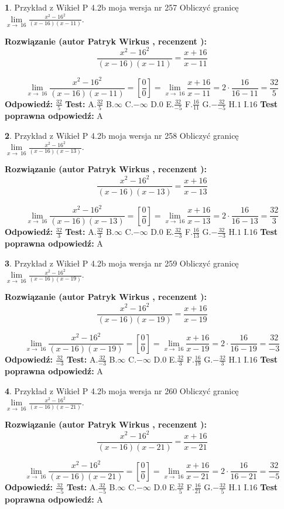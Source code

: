 \documentclass[12pt, a4paper]{article}
\theoremstyle{definition} %
\newtheorem{zad}{}
\newcommand{\zadStart}[1]{\begin{zad}#1\newline}
\newcommand{\zadStop}{\end{zad}}
\newcommand{\rozwStart}[2]{\noindent \textbf{Rozwiązanie (autor #1 , recenzent #2): }\newline}
\newcommand{\rozwStop}{\newline}
\newcommand{\odpStart}{\noindent \textbf{Odpowiedź:}\newline}
\newcommand{\odpStop}{\newline}
\newcommand{\testStart}{\noindent \textbf{Test:}\newline}
\newcommand{\testStop}{\newline}
\newcommand{\kluczStart}{\noindent \textbf{Test poprawna odpowiedź:}\newline}
\newcommand{\kluczStop}{\newline}
\begin{document}
\zadStart{Przykład z Wikieł P 4.2b moja wersja nr 257}
Obliczyć granicę $\lim\limits_{x\to\ 16}\frac{x^{2}-16^{2}}{(x-16)(x-11)}$.
\zadStop
\rozwStart{Patryk Wirkus}{}
$$\frac{x^{2}-16^{2}}{(x-16)(x-11)}=\frac{x+16}{x-11}$$

$$\lim\limits_{x\to\ 16}\frac{x^{2}-16^{2}}{(x-16)(x-11)}=[\frac{0}{0}]=\lim\limits_{x\to\ 16}\frac{x+16}{x-11}=2 \cdot \frac{16}{16-11} = \frac{32}{5}$$
\rozwStop
\odpStart
$\frac{32}{5}$
\odpStop
\testStart
A.$\frac{32}{5}$
B.$\infty$
C.$-\infty$
D.$0$
E.$\frac{32}{-5}$
F.$\frac{16}{11}$
G.$-\frac{32}{-5}$
H.$1$
I.$16$
\testStop
\kluczStart
A
\kluczStop



\zadStart{Przykład z Wikieł P 4.2b moja wersja nr 258}
Obliczyć granicę $\lim\limits_{x\to\ 16}\frac{x^{2}-16^{2}}{(x-16)(x-13)}$.
\zadStop
\rozwStart{Patryk Wirkus}{}
$$\frac{x^{2}-16^{2}}{(x-16)(x-13)}=\frac{x+16}{x-13}$$

$$\lim\limits_{x\to\ 16}\frac{x^{2}-16^{2}}{(x-16)(x-13)}=[\frac{0}{0}]=\lim\limits_{x\to\ 16}\frac{x+16}{x-13}=2 \cdot \frac{16}{16-13} = \frac{32}{3}$$
\rozwStop
\odpStart
$\frac{32}{3}$
\odpStop
\testStart
A.$\frac{32}{3}$
B.$\infty$
C.$-\infty$
D.$0$
E.$\frac{32}{-3}$
F.$\frac{16}{13}$
G.$-\frac{32}{-3}$
H.$1$
I.$16$
\testStop
\kluczStart
A
\kluczStop



\zadStart{Przykład z Wikieł P 4.2b moja wersja nr 259}
Obliczyć granicę $\lim\limits_{x\to\ 16}\frac{x^{2}-16^{2}}{(x-16)(x-19)}$.
\zadStop
\rozwStart{Patryk Wirkus}{}
$$\frac{x^{2}-16^{2}}{(x-16)(x-19)}=\frac{x+16}{x-19}$$

$$\lim\limits_{x\to\ 16}\frac{x^{2}-16^{2}}{(x-16)(x-19)}=[\frac{0}{0}]=\lim\limits_{x\to\ 16}\frac{x+16}{x-19}=2 \cdot \frac{16}{16-19} = \frac{32}{-3}$$
\rozwStop
\odpStart
$\frac{32}{-3}$
\odpStop
\testStart
A.$\frac{32}{-3}$
B.$\infty$
C.$-\infty$
D.$0$
E.$\frac{32}{3}$
F.$\frac{16}{19}$
G.$-\frac{32}{3}$
H.$1$
I.$16$
\testStop
\kluczStart
A
\kluczStop



\zadStart{Przykład z Wikieł P 4.2b moja wersja nr 260}
Obliczyć granicę $\lim\limits_{x\to\ 16}\frac{x^{2}-16^{2}}{(x-16)(x-21)}$.
\zadStop
\rozwStart{Patryk Wirkus}{}
$$\frac{x^{2}-16^{2}}{(x-16)(x-21)}=\frac{x+16}{x-21}$$

$$\lim\limits_{x\to\ 16}\frac{x^{2}-16^{2}}{(x-16)(x-21)}=[\frac{0}{0}]=\lim\limits_{x\to\ 16}\frac{x+16}{x-21}=2 \cdot \frac{16}{16-21} = \frac{32}{-5}$$
\rozwStop
\odpStart
$\frac{32}{-5}$
\odpStop
\testStart
A.$\frac{32}{-5}$
B.$\infty$
C.$-\infty$
D.$0$
E.$\frac{32}{5}$
F.$\frac{16}{21}$
G.$-\frac{32}{5}$
H.$1$
I.$16$
\testStop
\kluczStart
A
\kluczStop
\end{document}
